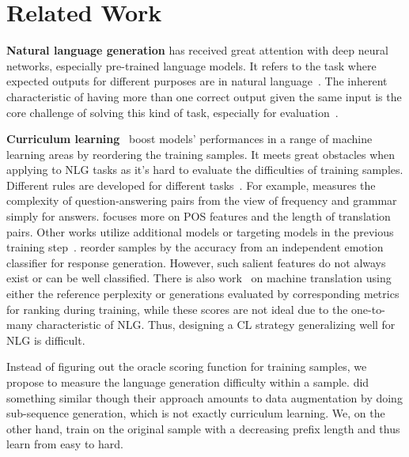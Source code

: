 \section{Related Work}
\textbf{Natural language generation} has received great attention with deep neural networks, especially pre-trained language models. It refers to the task where expected outputs for different purposes are in natural language~\cite{dong2021survey}. The inherent characteristic of having more than one correct output given the same input is the core challenge of solving this kind of task, especially for evaluation~\cite{singh2018does}.



\textbf{Curriculum learning}~\cite{bengio2009curriculum} boost models' performances in a range of machine learning areas by reordering the training samples.
It meets great obstacles when applying to NLG tasks as it's hard to evaluate the difficulties of training samples. 
Different rules are developed for different tasks~\cite{platanios2019competence,chang2021does}. For example, \cite{liu2018curriculum} measures the complexity of question-answering pairs from the view of frequency and grammar simply for answers. \cite{kocmi2017curriculum} focuses more on POS features and the length of translation pairs.
Other works utilize additional models or targeting models in the previous training step~\cite{zhang-etal-2019-curriculum,zhang2018empirical}. \cite{shen2020cdl} reorder samples by the accuracy from an independent emotion classifier for response generation. However, such salient features do not always exist or can be well classified. There is also work~\cite{zhou2020uncertainty} on machine translation using either the reference perplexity or generations evaluated by corresponding metrics for ranking during training, while these scores are not ideal due to the one-to-many characteristic of NLG. 
Thus, designing a CL strategy generalizing well for NLG is difficult.

Instead of figuring out the oracle scoring function for training samples, 
we propose to measure the language generation difficulty within a sample. 
\citet{liang-etal-2021-token-wise} did something similar though their approach
amounts to data augmentation by doing sub-sequence generation, which is
not exactly curriculum learning. We, on the other hand,  train on the original sample with a decreasing prefix length and thus learn from easy to hard.
